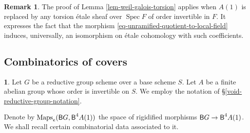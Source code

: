 \documentclass[10pt,english,reqno]{amsart}
\newcommand{\Isoc}{\textnormal{\textsf{Isoc}}}
\newcommand{\Maps}{\operatorname{Maps}}
\newcommand{\deloop}{\textnormal{\textsf{B}}}
\newcommand{\Spec}{\operatorname{Spec}}
\theoremstyle{definition}
\newtheorem{rem}[subsubsection]{Remark}
\numberwithin{equation}{section}
\newtheorem{untitledsubsubsection}[subsubsection]{}
\newenvironment{void}
{\begin{untitledsubsubsection}}
{\end{untitledsubsubsection}}
\begin{document}

\begin{rem}
The proof of Lemma \ref{lem-weil-galois-torsion} applies when $A(1)$ is replaced by any torsion \'etale sheaf over $\Spec F$ of order invertible in $F$. It expresses the fact that the morphism \eqref{eq-unramified-quotient-to-local-field} induces, universally, an isomorphism on \'etale cohomology with such coefficients.
\end{rem}

\subsection{Combinatorics of covers}

\begin{void}
Let $G$ be a reductive group scheme over a base scheme $S$. Let $A$ be a finite abelian group whose order is invertible on $S$. We employ the notation of \S\ref{void-reductive-group-notation}.

Denote by $\Maps_e(\deloop G, \deloop^4A(1))$ the space of rigidified morphisms $\deloop G \rightarrow \deloop^4A(1)$. We shall recall certain combinatorial data associated to it.
\end{void}
\end{document}
